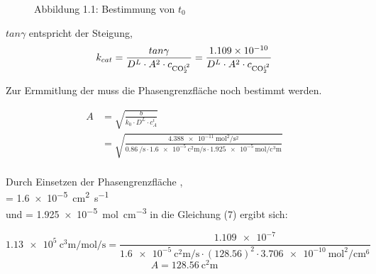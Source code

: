 \documentclass{article}
\begin{document}
\begin{onehalfspace}
\begin{figure}[htbp!]
\caption*{Abbildung 1.1: Bestimmung von $t_0$ }

\end{figure}
$tan \gamma$ entspricht der Steigung, 
\begin{equation}
  k_{cat} = \frac{tan \gamma}{D^L \cdot A^2 \cdot c_{\ce{CO2}^{i^2}}} = \frac{\num{1.109e-10}}{D^L \cdot A^2 \cdot c_{\ce{CO2}^{i^2}}}
\end{equation}

Zur Ermmitlung der  muss die Phasengrenzfläche  noch bestimmt werden. 

\begin{align}
  A &= \sqrt{\frac{b}{k_0 \cdot D^L \cdot c_A^i}} \\
    &= \sqrt{\frac{\SI{4.388e-11}{\square\mol\per\square\second}}{\SI{0.86}{\per\second} \cdot \SI{1.6e-5}{\square\centi\meter\per\second} \cdot \SI{1.925e-5}{\mol\per\cubic\centi\meter} }}\\
\end{align}

Durch Einsetzen der Phasengrenzfläche , \\ 
 = \SI{1.6e-5}{\square\centi\meter\per\second} \\ 
und  = \SI{1.925e-5}{\mol\per\cubic\centi\meter} in die Gleichung (7) ergibt sich:

\begin{equation}
 \SI{1.13e5}{\cubic\centi\meter\per\mol\per\second}=\frac{\num{1.109e-7}}{\SI{1.6e-5}{\square\centi\meter\per\second} \cdot (128.56)^2 \cdot \SI{3.706e-10}{\square\mol\per\centi\meter\tothe{6}} }
\end{equation}
\begin{equation}
  A = \SI{128.56}{\square\centi\meter}
\end{equation}
  

\end{onehalfspace}
\end{document}
